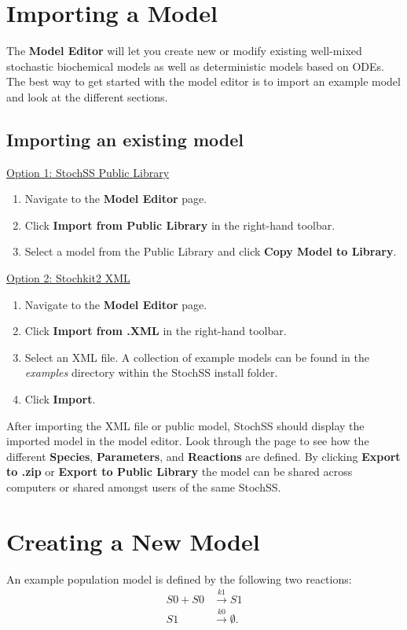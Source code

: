 \section{Importing a Model}
The \textbf{Model Editor} will let you create new or modify existing well-mixed stochastic biochemical models as well as deterministic models based on ODEs.
The best way to get started with the model editor is to import an example model and look at the different sections.

\subsection{Importing an existing model}

\underline{Option 1: StochSS Public Library}
\begin{enumerate}
  \item Navigate to the \textbf{Model Editor} page.
  \item Click \textbf{Import from Public Library} in the right-hand toolbar.
  \item Select a model from the Public Library and click \textbf{Copy Model to Library}.
\end{enumerate}

\noindent\underline{Option 2: Stochkit2 XML}
\begin{enumerate}
  \item Navigate to the \textbf{Model Editor} page.
  \item Click \textbf{Import from .XML} in the right-hand toolbar.
  \item Select an XML file. A collection of example models can be found in the \textit{examples} directory within the StochSS install folder.
  \item Click \textbf{Import}.
\end{enumerate}

After importing the XML file or public model, StochSS should display the imported model in the model editor.
Look through the page to see how the different \textbf{Species}, \textbf{Parameters}, and \textbf{Reactions} are defined.
By clicking \textbf{Export to .zip} or \textbf{Export to Public Library} the model can be shared across computers or shared amongst users of the same StochSS.

\section{Creating a New Model}
An example population model is defined by the following two reactions:
\begin{equation}
\label{eq:tut1-reac1}
\begin{aligned}
S0 + S0 &\xrightarrow{k1} S1\\
S1 &\xrightarrow{k0} \emptyset .  
\end{aligned}
\end{equation}

